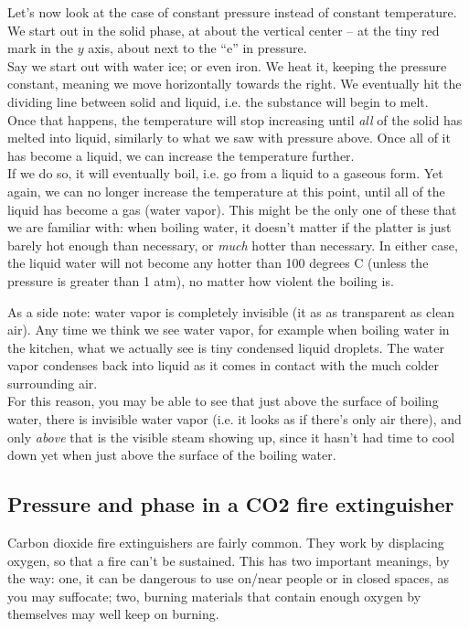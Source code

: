 \documentclass[8.01x]{subfiles}
\begin{document}
Let's now look at the case of constant pressure instead of constant temperature.\\
We start out in the solid phase, at about the vertical center -- at the tiny red mark in the $y$ axis, about next to the ``e'' in pressure.\\
Say we start out with water ice; or even iron. We heat it, keeping the pressure constant, meaning we move horizontally towards the right. We eventually hit the dividing line between solid and liquid, i.e. the substance will begin to melt.\\
Once that happens, the temperature will stop increasing until \emph{all} of the solid has melted into liquid, similarly to what we saw with pressure above. Once all of it has become a liquid, we can increase the temperature further.\\
If we do so, it will eventually boil, i.e. go from a liquid to a gaseous form. Yet again, we can no longer increase the temperature at this point, until all of the liquid has become a gas (water vapor). This might be the only one of these that we are familiar with: when boiling water, it doesn't matter if the platter is just barely hot enough than necessary, or \emph{much} hotter than necessary. In either case, the liquid water will not become any hotter than 100 degrees C (unless the pressure is greater than 1 atm), no matter how violent the boiling is.

As a side note: water vapor is completely invisible (it as as transparent as clean air). Any time we think we see water vapor, for example when boiling water in the kitchen, what we actually see is tiny condensed liquid droplets. The water vapor condenses back into liquid as it comes in contact with the much colder surrounding air.\\
For this reason, you may be able to see that just above the surface of boiling water, there is invisible water vapor (i.e. it looks as if there's only air there), and only \emph{above} that is the visible steam showing up, since it hasn't had time to cool down yet when just above the surface of the boiling water.

\subsection{Pressure and phase in a CO2 fire extinguisher}

Carbon dioxide fire extinguishers are fairly common. They work by displacing oxygen, so that a fire can't be sustained. This has two important meanings, by the way: one, it can be dangerous to use on/near people or in closed spaces, as you may suffocate; two, burning materials that contain enough oxygen by themselves may well keep on burning.
 
\end{document}
